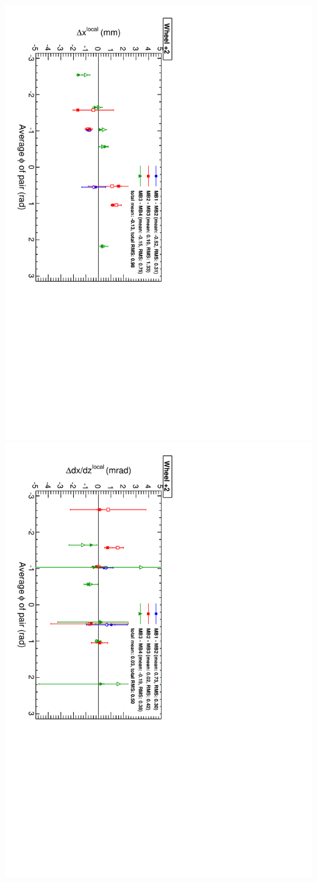 \documentclass[compress]{beamer}
\begin{document}
\begin{frame}
\vspace{-0.1 cm}
\includegraphics[height=0.5\linewidth, angle=90]{NOV4_segdiff_x_whp2.pdf}
\includegraphics[height=0.5\linewidth, angle=90]{NOV4_segdiff_dxdz_whp2.pdf}
\end{frame}
\end{document}
